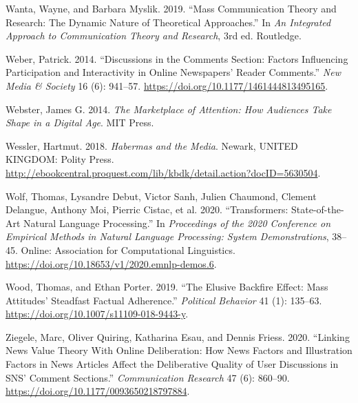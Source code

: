 \documentclass[
]{article}
\newlength{\cslhangindent}
\newlength{\cslentryspacingunit} %
\newenvironment{CSLReferences}[2] %
 {%
  \setlength{\parindent}{0pt}
  \ifodd #1
  \let\oldpar\par
  \def\par{\hangindent=\cslhangindent\oldpar}
  \fi
  \setlength{\parskip}{#2\cslentryspacingunit}
 }%
 {}
\begin{document}
\begin{CSLReferences}{1}{0}
\leavevmode{}%
Wanta, Wayne, and Barbara Myslik. 2019. {``Mass {Communication} {Theory}
and {Research}: {The} {Dynamic} {Nature} of {Theoretical}
{Approaches}.''} In \emph{An {Integrated} {Approach} to {Communication}
{Theory} and {Research}}, 3rd ed. Routledge.

\leavevmode{}%
Weber, Patrick. 2014. {``Discussions in the Comments Section: {Factors}
Influencing Participation and Interactivity in Online Newspapers' Reader
Comments.''} \emph{New Media \& Society} 16 (6): 941--57.
\url{https://doi.org/10.1177/1461444813495165}.

\leavevmode{}%
Webster, James G. 2014. \emph{The {Marketplace} of {Attention}: {How}
{Audiences} {Take} {Shape} in a {Digital} {Age}}. MIT Press.

\leavevmode{}%
Wessler, Hartmut. 2018. \emph{Habermas and the {Media}}. Newark, UNITED
KINGDOM: Polity Press.
\url{http://ebookcentral.proquest.com/lib/kbdk/detail.action?docID=5630504}.

\leavevmode{}%
Wolf, Thomas, Lysandre Debut, Victor Sanh, Julien Chaumond, Clement
Delangue, Anthony Moi, Pierric Cistac, et al. 2020. {``Transformers:
{State}-of-the-{Art} {Natural} {Language} {Processing}.''} In
\emph{Proceedings of the 2020 {Conference} on {Empirical} {Methods} in
{Natural} {Language} {Processing}: {System} {Demonstrations}}, 38--45.
Online: Association for Computational Linguistics.
\url{https://doi.org/10.18653/v1/2020.emnlp-demos.6}.

\leavevmode{}%
Wood, Thomas, and Ethan Porter. 2019. {``The {Elusive} {Backfire}
{Effect}: {Mass} {Attitudes}' {Steadfast} {Factual} {Adherence}.''}
\emph{Political Behavior} 41 (1): 135--63.
\url{https://doi.org/10.1007/s11109-018-9443-y}.

\leavevmode{}%
Ziegele, Marc, Oliver Quiring, Katharina Esau, and Dennis Friess. 2020.
{``Linking {News} {Value} {Theory} {With} {Online} {Deliberation}: {How}
{News} {Factors} and {Illustration} {Factors} in {News} {Articles}
{Affect} the {Deliberative} {Quality} of {User} {Discussions} in {SNS}'
{Comment} {Sections}.''} \emph{Communication Research} 47 (6): 860--90.
\url{https://doi.org/10.1177/0093650218797884}.

\end{CSLReferences}
\end{document}
